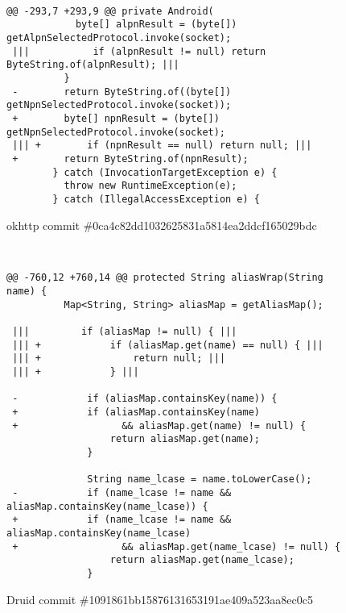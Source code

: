
\begin{figure*}
\begin{lstlisting}[moredelim={[is][\color{red}]{|||}{|||}}]

@@ -293,7 +293,9 @@ private Android(
            byte[] alpnResult = (byte[]) getAlpnSelectedProtocol.invoke(socket);
 |||           if (alpnResult != null) return ByteString.of(alpnResult); |||
          }
 -        return ByteString.of((byte[]) getNpnSelectedProtocol.invoke(socket));
 +        byte[] npnResult = (byte[]) getNpnSelectedProtocol.invoke(socket);
 ||| +        if (npnResult == null) return null; |||
 +        return ByteString.of(npnResult);
        } catch (InvocationTargetException e) {
          throw new RuntimeException(e);
        } catch (IllegalAccessException e) {
\end{lstlisting}
\caption{okhttp commit \#0ca4c82dd1032625831a5814ea2ddcf165029bdc\label{fig:null2}}
\end{figure*}


\begin{figure*}
\begin{lstlisting}[moredelim={[is][\color{red}]{|||}{|||}}]


@@ -760,12 +760,14 @@ protected String aliasWrap(String name) {
          Map<String, String> aliasMap = getAliasMap();
  
 |||         if (aliasMap != null) { |||
 ||| +            if (aliasMap.get(name) == null) { |||
 ||| +                return null; |||
 ||| +            } |||

 -            if (aliasMap.containsKey(name)) {
 +            if (aliasMap.containsKey(name)
 +            		&& aliasMap.get(name) != null) {
                  return aliasMap.get(name);
              }
              
              String name_lcase = name.toLowerCase();
 -            if (name_lcase != name && aliasMap.containsKey(name_lcase)) {
 +            if (name_lcase != name && aliasMap.containsKey(name_lcase)
 +            		&& aliasMap.get(name_lcase) != null) {
                  return aliasMap.get(name_lcase);
              }

\end{lstlisting}
\caption{Druid commit \#1091861bb15876131653191ae409a523aa8ec0c5\label{fig:null1}}
\end{figure*}


